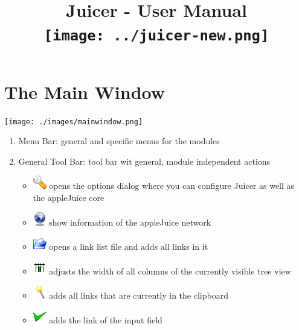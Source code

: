 \documentclass[a4paper,10pt]{book}
\title{Juicer - User Manual\\\texttt{[image: ../juicer-new.png]}}
\begin{document}
\maketitle


\section{The Main Window}

\texttt{[image: ./images/mainwindow.png]}


\begin{enumerate}
 \item Menu Bar: general and specific menus for the modules
 \item General Tool Bar: tool bar wit general, module independent actions\\
 \begin{itemize}
  \item \includegraphics[width=22px]{../configure.png} opens the options dialog where you can configure Juicer as well as the appleJuice core
  \item \includegraphics[width=22px]{../network.png} show information of the appleJuice network
  \item \includegraphics[width=22px]{../fileopen.png} opens a link list file and adds all links in it
  \item \includegraphics[width=22px]{../show_table_column.png} adjusts the width of all columns of the currently visible tree view
  \item \includegraphics[width=22px]{../wizard.png} adds all links that are currently in the clipboard
  \item \includegraphics[width=22px]{../button_ok.png} adds the link of the input field
 \end{itemize}

\end{enumerate}
\end{document}
